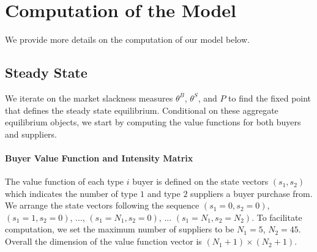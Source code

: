 \documentclass[12pt]{article} \usepackage{amsmath,amssymb,amsthm,geometry,graphicx,setspace,algorithm,algpseudocode,float}
\begin{document}
\section{Computation of the Model}
\label{app:computation}
We provide more details on the computation of our model below.  

\subsection{Steady State}
\label{app:steady_state}
We iterate on the market slackness measures $\theta^B$, $\theta^S$, and $P$ to find the fixed point that defines the steady state equilibrium. Conditional on these aggregate equilibrium objects, we start by computing the value functions for both buyers and suppliers.  

\paragraph{Buyer Value Function and Intensity Matrix}
The value function of each type $i$ buyer is defined on the state vectors $(s_1, s_2)$ which indicates the number of type $1$ and type $2$ suppliers a buyer purchase from. We arrange the state vectors following the sequence $(s_1 = 0, s_2 = 0)$,  $(s_1 = 1, s_2 = 0)$, ..., $(s_1 = N_1, s_2 = 0)$, ... $(s_1 = N_1, s_2 = N_2)$. To facilitate computation, we set the maximum number of suppliers to be $N_1 = 5$, $N_2 = 45$. Overall the dimension of the value function vector is $(N_1+1)\times (N_2+1)$. 
\end{document}
